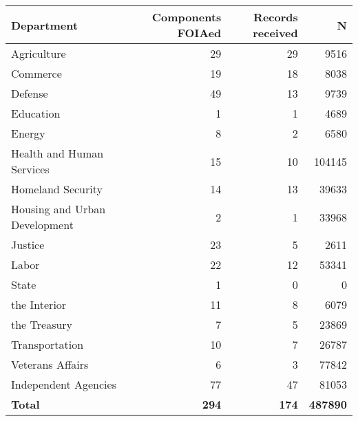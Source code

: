 
\begin{tabular}{lrrr}
\toprule
Department & Components FOIAed & Records received & N\\
\midrule
Agriculture & 29 & 29 & 9516\\
Commerce & 19 & 18 & 8038\\
Defense & 49 & 13 & 9739\\
Education & 1 & 1 & 4689\\
Energy & 8 & 2 & 6580\\
\addlinespace
Health and Human Services & 15 & 10 & 104145\\
Homeland Security & 14 & 13 & 39633\\
Housing and Urban Development & 2 & 1 & 33968\\
Justice & 23 & 5 & 2611\\
Labor & 22 & 12 & 53341\\
\addlinespace
State & 1 & 0 & 0\\
the Interior & 11 & 8 & 6079\\
the Treasury & 7 & 5 & 23869\\
Transportation & 10 & 7 & 26787\\
Veterans Affairs & 6 & 3 & 77842\\
\addlinespace
Independent Agencies & 77 & 47 & 81053\\
\midrule
\textbf{Total} & \textbf{294} & \textbf{174} & \textbf{487890}\\
\bottomrule
\end{tabular}
